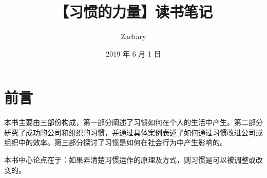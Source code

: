 \documentclass[geye,green,pad,cn]{elegantnote}
\title{【习惯的力量】读书笔记}
\author{Zachary}
\date{2019 年 6 月 1 日}
\begin{document}
\maketitle
\tableofcontents

\section{前言}
本书主要由三部份构成，第一部分阐述了习惯如何在个人的生活中产生。第二部分研究了成功的公司和组织的习惯，并通过具体案例表述了如何通过习惯改进公司或组织中的效率。第三部分探讨了习惯是如何在社会行为中产生影响的。

本书中心论点在于：如果弄清楚习惯运作的原理及方式，则习惯是可以被调整或改变的。
\end{document}

